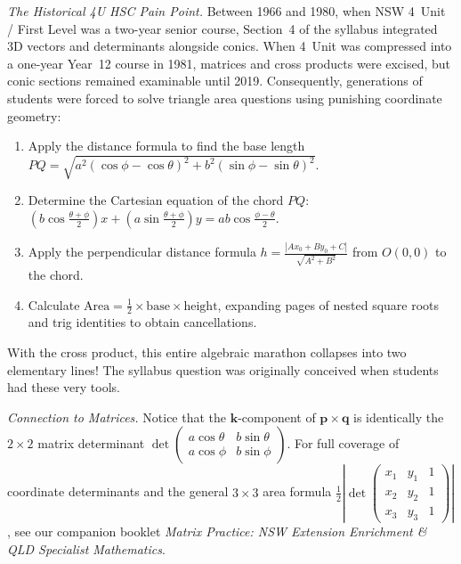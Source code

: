\vspace{0.3em}
\noindent\textit{The Historical 4U HSC Pain Point.}
Between 1966 and 1980, when NSW 4~Unit / First Level was a two-year senior course, Section~4 of the syllabus integrated 3D vectors and determinants alongside conics. When 4~Unit was compressed into a one-year Year~12 course in 1981, matrices and cross products were excised, but conic sections remained examinable until 2019. Consequently, generations of students were forced to solve triangle area questions using punishing coordinate geometry:
\begin{enumerate}[leftmargin=*,itemsep=1pt]
  \item Apply the distance formula to find the base length $PQ = \sqrt{a^2(\cos\phi - \cos\theta)^2 + b^2(\sin\phi - \sin\theta)^2}$.
  \item Determine the Cartesian equation of the chord $PQ$: $(b\cos\tfrac{\theta+\phi}{2})x + (a\sin\tfrac{\theta+\phi}{2})y = ab\cos\tfrac{\phi-\theta}{2}$.
  \item Apply the perpendicular distance formula $h = \frac{|Ax_0 + By_0 + C|}{\sqrt{A^2 + B^2}}$ from $O(0,0)$ to the chord.
  \item Calculate $\text{Area} = \frac{1}{2} \times \text{base} \times \text{height}$, expanding pages of nested square roots and trig identities to obtain cancellations.
\end{enumerate}
With the cross product, this entire algebraic marathon collapses into two elementary lines! The syllabus question was originally conceived when students had these very tools.

\vspace{0.3em}
\noindent\textit{Connection to Matrices.}
Notice that the $\mathbf{k}$-component of $\mathbf{p}\times\mathbf{q}$ is identically the $2\times 2$ matrix determinant $\det \begin{pmatrix} a\cos\theta & b\sin\theta \\ a\cos\phi & b\sin\phi \end{pmatrix}$. For full coverage of coordinate determinants and the general $3\times 3$ area formula $\frac{1}{2}\left|\det \begin{pmatrix} x_1 & y_1 & 1 \\ x_2 & y_2 & 1 \\ x_3 & y_3 & 1 \end{pmatrix}\right|$, see our companion booklet \emph{Matrix Practice: NSW Extension Enrichment \& QLD Specialist Mathematics}.

